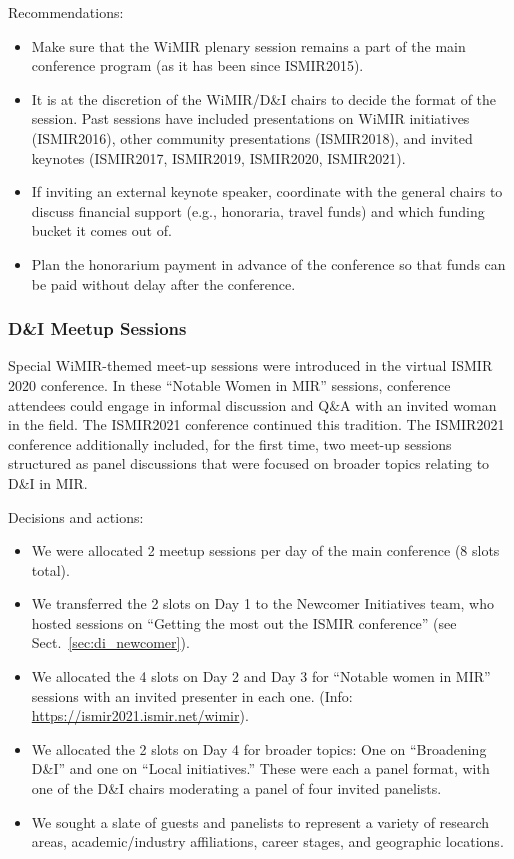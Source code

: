 \documentclass[%
10pt,								%
titlepage,						%
]
{scrartcl}
\begin{document}
            Recommendations:
            \begin{itemize}
                \item   Make sure that the WiMIR plenary session remains a part of the main conference program (as it has been since ISMIR2015). 
                \item   It is at the discretion of the WiMIR/D\&I chairs to decide the format of the session. Past sessions have included presentations on WiMIR initiatives (ISMIR2016), other community presentations (ISMIR2018), and invited keynotes (ISMIR2017, ISMIR2019, ISMIR2020, ISMIR2021). 
                \item   If inviting an external keynote speaker, coordinate with the general chairs to discuss financial support (e.g., honoraria, travel funds) and which funding bucket it comes out of.
                \item   Plan the honorarium payment in advance of the conference so that funds can be paid without delay after the conference.
            \end{itemize}

        \subsubsection{D\&I Meetup Sessions}\label{sec:di_meetup}
            Special WiMIR-themed meet-up sessions were introduced in the virtual ISMIR 2020 conference. In these ``Notable Women in MIR'' sessions, conference attendees could engage in informal discussion and Q\&A with an invited woman in the field. The ISMIR2021 conference continued this tradition. The ISMIR2021 conference additionally included, for the first time, two meet-up sessions structured as panel discussions that were focused on broader topics relating to D\&I in MIR.
            
                Decisions and actions:
                \begin{itemize}
                    \item   We were allocated 2 meetup sessions per day of the main conference (8 slots total).
                    \item   We transferred the 2 slots on Day 1 to the Newcomer Initiatives team, who hosted sessions on ``Getting the most out the ISMIR conference'' (see Sect.~\ref{sec:di_newcomer}).
                    \item   We allocated the 4 slots on Day 2 and Day 3 for ``Notable women in MIR'' sessions with an invited presenter in each one. (Info: \href{https://ismir2021.ismir.net/wimir}{https://ismir2021.ismir.net/wimir}).
                    \item   We allocated the 2 slots on Day 4 for broader topics: One on ``Broadening D\&I'' and one on ``Local initiatives.'' These were each a panel format, with one of the D\&I chairs moderating a panel of four invited panelists.
                    \item   We sought a slate of guests and panelists to represent a variety of research areas, academic/industry affiliations, career stages, and geographic locations.
                \end{itemize}
\end{document}
